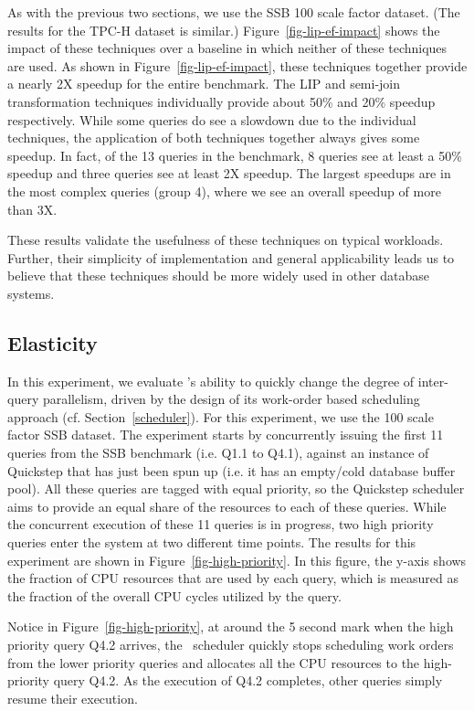 As with the previous two sections, we use the SSB 100 scale factor dataset. (The results for the TPC-H dataset is similar.)
Figure~\ref{fig-lip-ef-impact} shows the impact of these techniques over a baseline in which neither of these techniques are used. As shown in Figure~\ref{fig-lip-ef-impact}, these techniques together provide a nearly 2X speedup for the entire benchmark. The LIP and semi-join transformation techniques individually provide about 50\% and 20\% speedup
respectively. While some queries do see a slowdown due to the individual techniques, the application of both
techniques together always gives some speedup. In fact, of the 13 queries in the benchmark,
8 queries see at least a 50\% speedup and three queries see at least 2X speedup. The largest speedups
are in the most complex queries (group 4), where we see an overall speedup of more than 3X.

These results validate the usefulness of these techniques on typical workloads. Further, their simplicity of implementation and general applicability leads us to believe that these techniques should be more
widely used in other database systems.

\subsection{Elasticity} \label{sec:expt:elasticity}
In this experiment, we evaluate \Quickstep's ability to quickly change the degree of inter-query parallelism, driven by the design of its work-order based scheduling approach (cf. Section~\ref{scheduler}). For this experiment, we use the 100 scale factor SSB dataset. The experiment starts by concurrently issuing the first 11 queries from the SSB benchmark (i.e. Q1.1 to Q4.1), against an instance of Quickstep that has just been spun up (i.e. it has an empty/cold database buffer pool).
All these queries are tagged with equal priority, so the Quickstep scheduler aims to provide an equal share of the resources to each of these queries. While the concurrent execution of these 11 queries is in progress, two high priority queries enter the system at two different time points. The results for this experiment are shown in Figure~\ref{fig-high-priority}.
In this figure, the y-axis shows the fraction of CPU resources that are used by each query, which is measured as the fraction of the overall CPU cycles utilized by the query.

Notice in Figure~\ref{fig-high-priority}, at around the 5 second mark when the high priority query Q4.2 arrives, the \Quickstep\ scheduler quickly stops scheduling work orders from the lower priority queries and allocates all the CPU resources to the high-priority query Q4.2.
As the execution of Q4.2 completes, other queries simply resume their execution.

